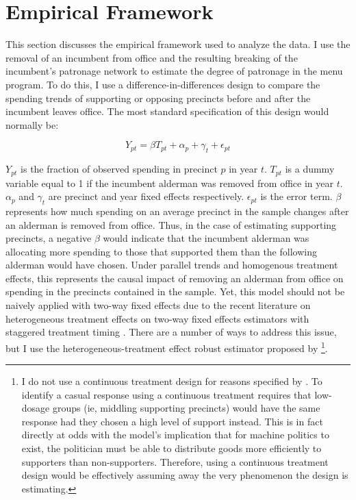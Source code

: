 \section{Empirical Framework}\label{sec:empframe}
This section discusses the empirical framework used to analyze the data.
I use the removal of an incumbent from office and the resulting breaking of the incumbent's patronage network to estimate the degree of patronage in the menu program.
To do this, I use a difference-in-differences design to compare the spending trends of supporting or opposing precincts before and after the incumbent leaves office. 
The most standard specification of this design would normally be:

\begin{equation}\label{eq:standard_did}
    Y_{pt} =  \beta T_{pt} + \alpha_{p} + \gamma_{t} + \epsilon_{pt}
\end{equation}

$Y_{pt}$ is the fraction of observed spending in precinct $p$ in year $t$. $T_{pt}$ is a dummy variable equal to 1 if the incumbent alderman was removed from office in year $t$. $\alpha_{p}$ and $\gamma_{t}$ are precinct and year fixed effects respectively. $\epsilon_{pt}$ is the error term.
$\beta$ represents how much spending on an average precinct in the sample changes after an alderman is removed from office.
Thus, in the case of estimating supporting precincts, a negative $\beta$ would indicate that the incumbent alderman was allocating more spending to those that supported them than the following alderman would have chosen.
Under parallel trends and homogenous treatment effects, this represents the causal impact of removing an alderman from office on spending in the precincts contained in the sample.
Yet, this model should not be naively applied with two-way fixed effects due to the recent literature on heterogeneous treatment effects on two-way fixed effects estimators with staggered treatment timing \citep{chaisetwfe} \citep{CALLAWAY2021200}. 
There are a number of ways to address this issue, but I use the heterogeneous-treatment effect robust estimator proposed by \citep{CALLAWAY2021200}\footnote[1]{I do not use a continuous treatment design for reasons specified by \cite{callaway2021_continuous}.
To identify a casual response using a continuous treatment requires that low-dosage groups (ie, middling supporting precincts) would have the same response had they chosen a high level of support instead.
This is in fact directly at odds with the \cite{dixit_londregan1996} model's implication that for machine politics to exist, the politician must be able to distribute goods more efficiently to supporters than non-supporters.
Therefore, using a continuous treatment design would be effectively assuming away the very phenomenon the design is estimating.}.


